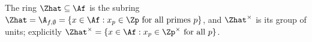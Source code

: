 The ring $\Zhat\subseteq\Af$ is the subring $\Zhat=\A_{f,\emptyset}=\{x\in\Af:x_p\in\Zp\text{ for all primes }p\}$, and
$\Zhat^\times$ is its group of units; explicitly $\Zhat^\times=\{x\in\Af:x_p\in\Zp^\times\text{ for all }p\}$.
